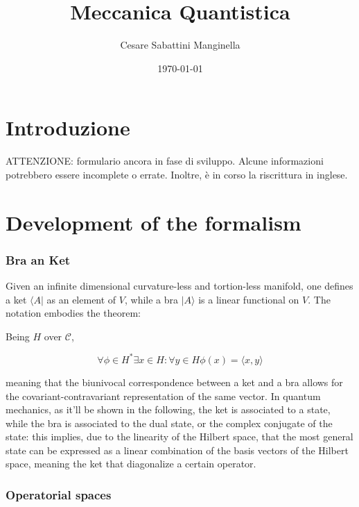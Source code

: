 \documentclass{report}
\title{Meccanica Quantistica}
\author{Cesare Sabattini Manginella}
\date{\today}
\begin{document}
\maketitle

\tableofcontents
\newpage

\chapter{Introduzione}
ATTENZIONE: formulario ancora in fase di sviluppo. Alcune informazioni potrebbero essere incomplete o errate.
Inoltre, è in corso la riscrittura in inglese.



\chapter{Development of the formalism}

\subsection{Bra an Ket}

Given an infinite dimensional curvature-less and tortion-less manifold, one defines a ket $\langle A|$ as an element of $V$, while a bra $|A\rangle $ is a linear functional on $V$.
The notation embodies the theorem:

\begin{tcolorbox}[colframe=gray!50, colback=gray!10, coltitle=black, title=Fisher Reisz Representation Theorem]
  Being  $H$ over $\mathcal{C}$,

  \begin{equation}
    \forall \phi \in H^* \exists x \in H : \forall y \in H \phi(x)=\langle x,y\rangle
  \end{equation}
\end{tcolorbox}

meaning that the biunivocal correspondence between a ket and a bra allows for the covariant-contravariant representation of the same vector.
In quantum mechanics, as it'll be shown in the following, the ket is associated to a state, while the bra is associated to the dual state, or the complex conjugate of the state:
this implies, due to the linearity of the Hilbert space, that the most general state can be expressed as a linear combination of the basis vectors of the Hilbert space, meaning
the ket that diagonalize a certain operator.

\subsection{Operatorial spaces}
\end{document}
